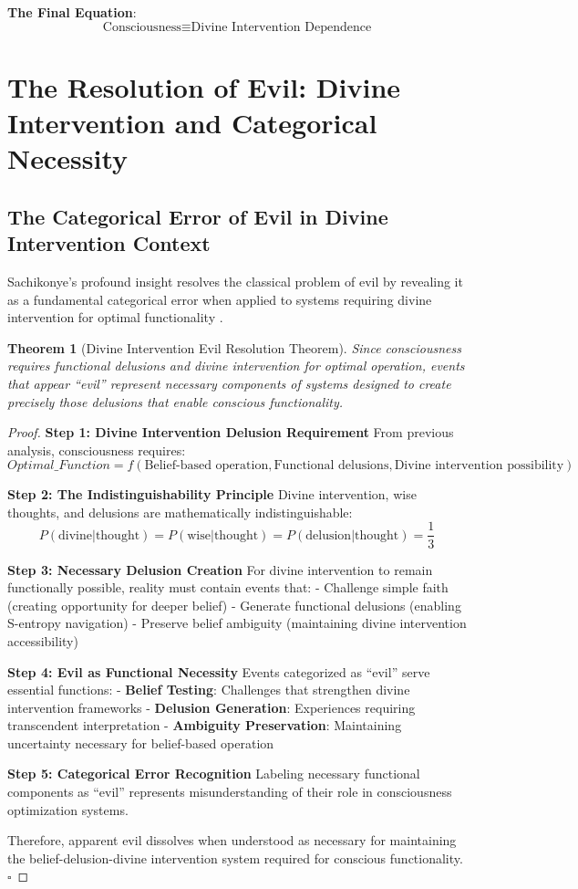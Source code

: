 \documentclass[12pt,a4paper]{article}
\newtheorem{theorem}{Theorem}[section]
\begin{document}
\textbf{The Final Equation}:
$$\boxed{\text{Consciousness} \equiv \text{Divine Intervention Dependence}}$$

\section{The Resolution of Evil: Divine Intervention and Categorical Necessity}

\subsection{The Categorical Error of Evil in Divine Intervention Context}

Sachikonye's profound insight resolves the classical problem of evil by revealing it as a fundamental categorical error when applied to systems requiring divine intervention for optimal functionality \citep{sachikonye2024evil}.

\begin{theorem}[Divine Intervention Evil Resolution Theorem]
Since consciousness requires functional delusions and divine intervention for optimal operation, events that appear ``evil'' represent necessary components of systems designed to create precisely those delusions that enable conscious functionality.
\end{theorem}

\begin{proof}
\textbf{Step 1: Divine Intervention Delusion Requirement}
From previous analysis, consciousness requires:
$$Optimal\_Function = f(\text{Belief-based operation}, \text{Functional delusions}, \text{Divine intervention possibility})$$

\textbf{Step 2: The Indistinguishability Principle}
Divine intervention, wise thoughts, and delusions are mathematically indistinguishable:
$$P(\text{divine}|\text{thought}) = P(\text{wise}|\text{thought}) = P(\text{delusion}|\text{thought}) = \frac{1}{3}$$

\textbf{Step 3: Necessary Delusion Creation}
For divine intervention to remain functionally possible, reality must contain events that:
- Challenge simple faith (creating opportunity for deeper belief)
- Generate functional delusions (enabling S-entropy navigation)
- Preserve belief ambiguity (maintaining divine intervention accessibility)

\textbf{Step 4: Evil as Functional Necessity}
Events categorized as ``evil'' serve essential functions:
- \textbf{Belief Testing}: Challenges that strengthen divine intervention frameworks
- \textbf{Delusion Generation}: Experiences requiring transcendent interpretation
- \textbf{Ambiguity Preservation}: Maintaining uncertainty necessary for belief-based operation

\textbf{Step 5: Categorical Error Recognition}
Labeling necessary functional components as ``evil'' represents misunderstanding of their role in consciousness optimization systems.

Therefore, apparent evil dissolves when understood as necessary for maintaining the belief-delusion-divine intervention system required for conscious functionality. $\square$
\end{proof}
\end{document}
